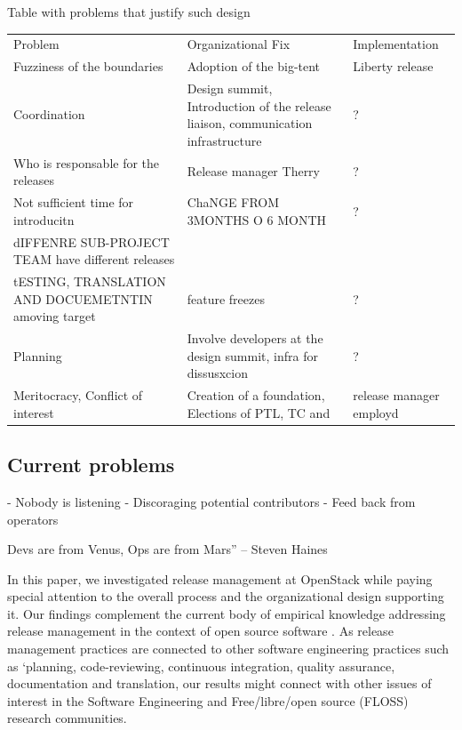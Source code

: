 \documentclass[dvipsnames]{interact}
\theoremstyle{plain}\newtheorem{theorem}{Theorem}[section]
\theoremstyle{definition}
\theoremstyle{remark}
\newenvironment{newStuff}{
    \begin{color}{Sepia}
    \begin{tabular}{|p{1.0\textwidth}|}
    \hline\\
    }
    { 
    \\\\\hline
    \end{tabular} 
    \end{color}
    }
\renewenvironment{newStuff}{}{}
\begin{document}
\begin{newStuff}
\begin{newStuff}
Table with problems that justify such design 
\begin{table}[H]
\begin{tabular} {lll}
Problem & Organizational Fix & Implementation\\
Fuzziness of the boundaries & Adoption of the big-tent  & Liberty release\\
Coordination & Design summit, Introduction of the release liaison, communication infrastructure & ? \\ 
Who is responsable for the releases & Release manager Therry & ? \\ 
Not sufficient time for introducitn & ChaNGE FROM 3MONTHS O 6 MONTH & ? \\ 
dIFFENRE SUB-PROJECT TEAM have different releases & & \\ 
tESTING, TRANSLATION AND DOCUEMETNTIN  amoving target & feature freezes &  ? \\ 
Planning & Involve developers at the design summit, infra
 for dissusxcion & ? \\ 
 Meritocracy, Conflict of interest & Creation of a foundation, Elections of PTL, TC and &  release manager employd   \\  
\end{tabular}
\end{table}




\end{newStuff}


\subsection{Current problems}




- Nobody is listening 
- Discoraging potential contributors 
- Feed back from operators 

Devs are from Venus, Ops are from Mars” – Steven Haines 

\end{newStuff}









In this paper, we investigated release management at OpenStack while paying special attention to the overall process and the organizational design supporting it. Our findings complement the current body of empirical knowledge addressing release management in the context of open source software \citep{MichlmayrFitzgerald_et_al2015,PooCaamanoKnauss_et_al2017}. As release management practices are connected to other software engineering practices such as `planning, code-reviewing, continuous integration, quality assurance, documentation and translation, our results might connect with other issues of interest in the Software Engineering and Free/libre/open source (FLOSS) research communities. 
\end{document}
